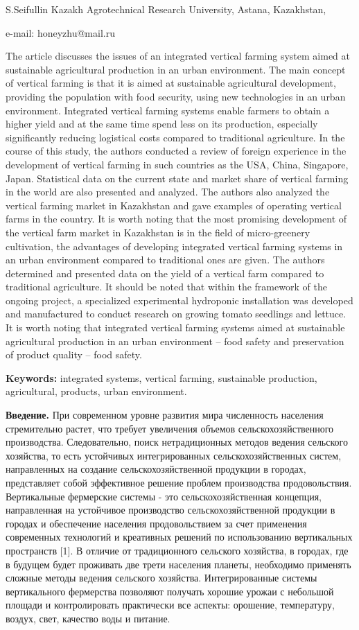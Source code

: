 S.Seifullin Kazakh Agrotechnical Research University, Astana,
Kazakhstan,

e-mail: honeyzhu@mail.ru

The article discusses the issues of an integrated vertical farming
system aimed at sustainable agricultural production in an urban
environment. The main concept of vertical farming is that it is aimed at
sustainable agricultural development, providing the population with food
security, using new technologies in an urban environment. Integrated
vertical farming systems enable farmers to obtain a higher yield and at
the same time spend less on its production, especially significantly
reducing logistical costs compared to traditional agriculture. In the
course of this study, the authors conducted a review of foreign
experience in the development of vertical farming in such countries as
the USA, China, Singapore, Japan. Statistical data on the current state
and market share of vertical farming in the world are also presented and
analyzed. The authors also analyzed the vertical farming market in
Kazakhstan and gave examples of operating vertical farms in the country.
It is worth noting that the most promising development of the vertical
farm market in Kazakhstan is in the field of micro-greenery cultivation,
the advantages of developing integrated vertical farming systems in an
urban environment compared to traditional ones are given. The authors
determined and presented data on the yield of a vertical farm compared
to traditional agriculture. It should be noted that within the framework
of the ongoing project, a specialized experimental hydroponic
installation was developed and manufactured to conduct research on
growing tomato seedlings and lettuce. It is worth noting that integrated
vertical farming systems aimed at sustainable agricultural production in
an urban environment -- food safety and preservation of product quality
-- food safety.

{\bfseries Keywords:} integrated systems, vertical farming, sustainable
production, agricultural, products, urban environment.

{\bfseries Введение.} При современном уровне развития мира численность
населения стремительно растет, что требует увеличения объемов
сельскохозяйственного производства. Следовательно, поиск нетрадиционных
методов ведения сельского хозяйства, то есть устойчивых интегрированных
сельскохозяйственных систем, направленных на создание
сельскохозяйственной продукции в городах, представляет собой эффективное
решение проблем производства продовольствия. Вертикальные фермерские
системы - это сельскохозяйственная концепция, направленная на устойчивое
производство сельскохозяйственной продукции в городах и обеспечение
населения продовольствием за счет применения современных технологий и
креативных решений по использованию вертикальных пространств {[}1{]}. В
отличие от традиционного сельского хозяйства, в городах, где в будущем
будет проживать две трети населения планеты, необходимо применять
сложные методы ведения сельского хозяйства. Интегрированные системы
вертикального фермерства позволяют получать хорошие урожаи с небольшой
площади и контролировать практически все аспекты: орошение, температуру,
воздух, свет, качество воды и питание.

